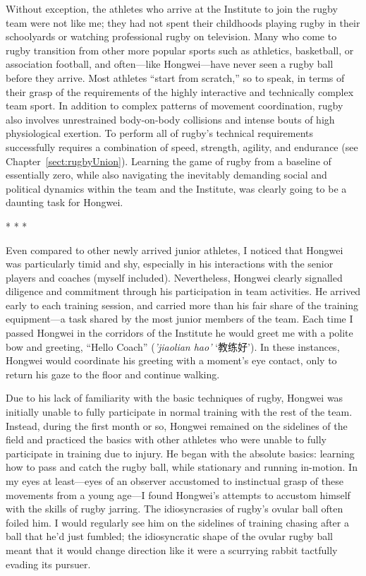 \begin{CJK}{UTF8}{gbsn}
Without exception, the athletes who arrive at the Institute to join the rugby team were not like me; they had not spent their childhoods playing rugby in their schoolyards or watching professional rugby on television. Many who come to rugby transition from other more popular sports such as athletics, basketball, or association football, and often---like Hongwei---have never seen a rugby ball before they arrive.  Most athletes ``start from scratch,'' so to speak, in terms of their grasp of the requirements of the highly interactive and technically complex team sport.  In addition to complex patterns of movement coordination, rugby also involves unrestrained body-on-body collisions and intense bouts of high physiological exertion.  To perform all of rugby’s technical requirements successfully requires a combination of speed, strength, agility, and endurance (see Chapter~\ref{sect:rugbyUnion}).  Learning the game of rugby from a baseline of essentially zero, while also navigating the inevitably demanding social and political dynamics within the team and the Institute, was clearly going to be a daunting task for Hongwei.


                        \begin{center}
                          * * *
                        \end{center}

 Even compared to other newly arrived junior athletes, I noticed that Hongwei was particularly timid and shy, especially in his interactions with the senior players and coaches (myself included).  Nevertheless, Hongwei clearly signalled diligence and commitment through his participation in team activities.  He arrived early to each training session, and carried more than his fair share of the training equipment---a task shared by the most junior members of the team.  Each time I passed Hongwei in the corridors of the Institute he would greet me with a polite bow and greeting, ``Hello Coach'' (\textit{'jiaolian hao'} `教练好').  In these instances, Hongwei would coordinate his greeting with a moment's eye contact, only to return his gaze to the floor and continue walking.

Due to his lack of familiarity with the basic techniques of rugby, Hongwei was initially unable to fully participate in normal training with the rest of the team.  Instead, during the first month or so, Hongwei remained on the sidelines of the field and practiced the basics with other athletes who were unable to fully participate in training due to injury. He began with the absolute basics: learning how to pass and catch the rugby ball, while stationary and running in-motion. In my eyes at least---eyes of an observer accustomed to instinctual grasp of these movements from a young age---I found Hongwei’s attempts to accustom himself with the skills of rugby jarring. The idiosyncrasies of rugby’s ovular ball often foiled him.  I would regularly see him on the sidelines of training chasing after a ball that he’d just fumbled; the idiosyncratic shape of the ovular rugby ball meant that it would change direction like it were a scurrying rabbit tactfully evading its pursuer.


\end{CJK}
